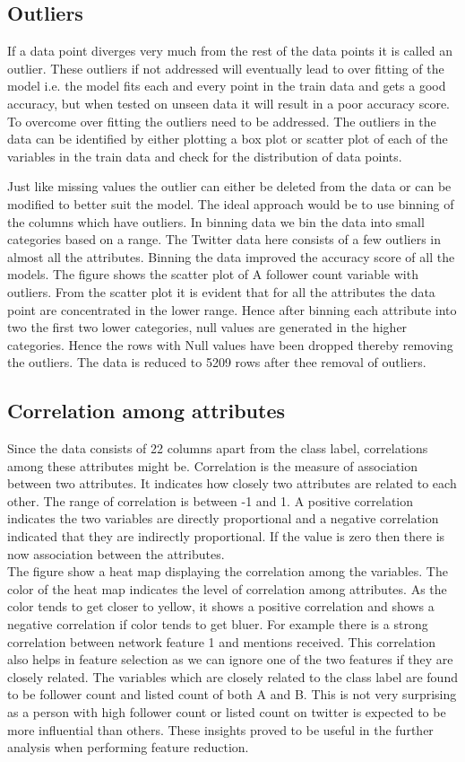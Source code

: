\documentclass[sigconf]{acmart}
\begin{document}
\subsection{Outliers}
If a data point diverges very much from the rest of the data points it is called an outlier. These outliers if not addressed will eventually lead to over fitting of the model i.e. the model fits each and every point in the train data and gets a good accuracy, but when tested on unseen data it will result in a poor accuracy score. To overcome over fitting the outliers need to be addressed. The outliers in the data can be identified by either plotting a box plot or scatter plot of each of the variables in the train data and check for the distribution of data points.

Just like missing values the outlier can either be deleted from the data or can be modified to better suit the model. The ideal approach would be to use binning of the columns which have outliers. In binning data we bin the data into small categories based on a range. The Twitter data here consists of a few outliers in almost all the attributes. Binning the data improved the accuracy score of all the models. The figure shows the scatter plot of A follower count variable with outliers. From the scatter plot it is evident that for all the attributes the data point are concentrated in the lower range. Hence after binning each attribute into two the first two lower categories, null values are generated in the higher categories. Hence the rows with Null values have been dropped thereby removing the outliers. The data is reduced to 5209 rows after thee removal of outliers. 

\subsection{Correlation among attributes}

Since the data consists of 22 columns apart from the class label, correlations among these attributes might be. Correlation is the measure of association between two attributes. It indicates how closely two attributes are related to each other. The range of correlation is between -1 and 1. A positive correlation indicates the two variables are directly proportional and a negative correlation indicated that they are indirectly proportional. If the value is zero then there is now association between the attributes.\\
The figure show a heat map displaying the correlation among the variables. The color of the heat map indicates the level of correlation among attributes. As the color tends to get closer to yellow, it shows a positive correlation and shows a negative correlation if color tends to get bluer. For example there is a strong correlation between network feature 1 and mentions received. This correlation also helps in feature selection as we can ignore one of the two features if they are closely related. The variables which are closely related to the class label are found to be follower count and listed count of both A and B. This is not very surprising as a person with high follower count or listed count on twitter is expected to be more influential than others. These insights proved to  be useful in the further analysis when performing feature reduction.
\end{document}
